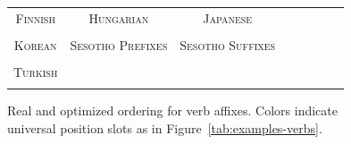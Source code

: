 \documentclass[man]{apa7}
\begin{document}
\begin{figure}[]

\begin{tabular}{cccccccc}
\textsc{Finnish} & \textsc{Hungarian} & \textsc{Japanese} \\
\begin{minipage}{.3\textwidth}
  
  \end{minipage}
  &
  \begin{minipage}{.3\textwidth}
  
  \end{minipage}
  &
    \begin{minipage}{.3\textwidth}
  
  \end{minipage}
  \\
  \textsc{Korean}  & \textsc{Sesotho Prefixes} &
  \textsc{Sesotho Suffixes} \\
      \begin{minipage}{.3\textwidth}
  
  \end{minipage}
  &
  \begin{minipage}{.3\textwidth}
  
  \end{minipage}
  &
  \begin{minipage}{.3\textwidth}
  
  \end{minipage} \\
  \textsc{Turkish} \\
  \begin{minipage}{.3\textwidth}
  
  \end{minipage}
  \end{tabular}
  
  
    \caption{Real and optimized ordering for verb affixes. Colors indicate universal position slots as in Figure~\ref{tab:examples-verbs}.
    }
    \label{fig:real_and_optimized_verbs}
\end{figure}
\end{document}

